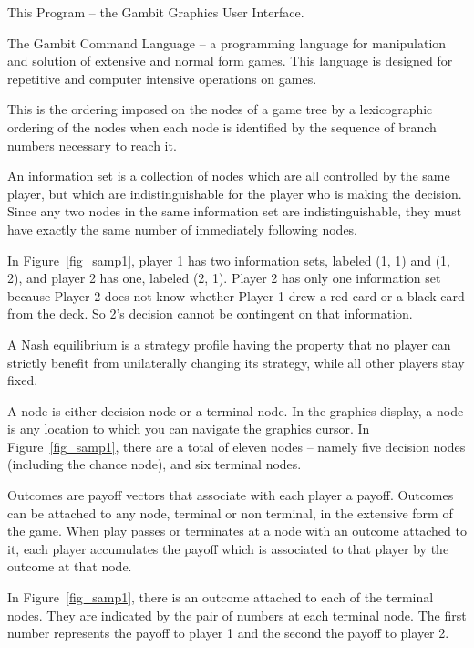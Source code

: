 \documentclass[12pt]{report}
\begin{document}
\begin{helpglossary}
\label{guigloss}
This Program -- the Gambit Graphics User Interface.

\label{gclgloss}
The Gambit Command Language -- a programming language for manipulation and
solution of extensive and normal form games.  This language is designed
for repetitive and computer intensive operations on games.  

\label{indextravgloss}
This is the ordering imposed on the nodes of a game tree by a lexicographic 
ordering of the nodes when each node is identified by the sequence of branch 
numbers necessary to reach it.  

\label{infosetgloss}
An information set is a collection of nodes which are all controlled by
the same player, but which are indistinguishable 
for the player who is making the decision.  Since any two nodes 
in the same information set are indistinguishable, they must have exactly 
the same number of immediately following nodes. 

In Figure~\ref{fig_samp1}, player 1 has two information
sets, labeled (1, 1) and (1, 2), and player 2 has one, labeled (2, 1).
Player 2 has only one information set because Player 2 does not know whether
 Player 1 drew a red card or a black card from the deck.  So 2's decision 
cannot be contingent on that information.

\label{nashequigloss}
A Nash equilibrium is a strategy profile having the property that no player 
can strictly benefit from unilaterally changing its strategy, while all 
other players stay fixed.  

\label{nodegloss}
A node is either decision node or a terminal node.  In the graphics 
display, a node is any location to which you can navigate the graphics 
cursor. In Figure~\ref{fig_samp1}, there are a total of eleven nodes -- namely 
five decision nodes (including the chance node), and six terminal nodes.  

\label{outcomegloss}
Outcomes are payoff vectors that associate with each player a payoff.  
Outcomes can be attached to any node, terminal or non terminal, in the 
extensive form of the game.  When play passes or terminates at a node 
with an outcome attached to it, each player accumulates the payoff which 
is associated to that player by the outcome at that node. 

In Figure~\ref{fig_samp1}, there is an outcome attached to each of the
terminal nodes.  They are indicated by the pair of numbers at each
terminal node.  The first number represents the payoff to player 1 and the
second the payoff to player 2.


\end{helpglossary}
\end{document}
